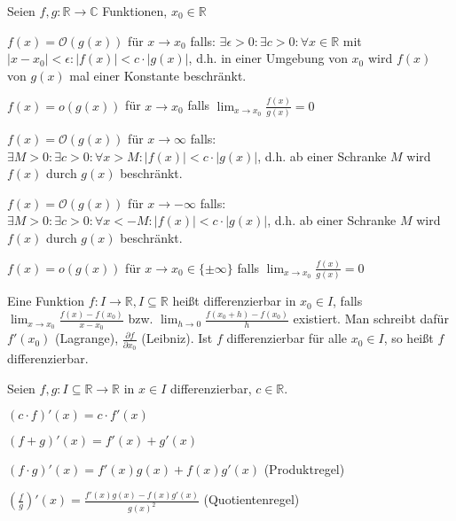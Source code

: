 \documentclass[]{article}
\begin{document}
\begin{definition}
	Seien $f,g : \mathbb{R} \rightarrow \mathbb{C}$ Funktionen, $x_0 \in \mathbb{R}$
	\begin{description}[noitemsep]
		\item $f(x) = \mathcal{O}(g(x))$ für $x \rightarrow x_0$ falls: $\exists \epsilon > 0: \exists c > 0 : \forall x \in \mathbb{R}$ mit $|x - x _0| < \epsilon : |f(x)| < c \cdot |g(x)|$, d.h. in einer Umgebung von $x_0$ wird $f(x)$ von $g(x)$ mal einer Konstante beschränkt.
		\item $f(x) = o(g(x))$ für $x \rightarrow x_0$ falls $\lim_{x \rightarrow x_0} \frac{f(x)}{g(x)} = 0 $
		\item $f(x) = \mathcal{O}(g(x))$ für $x \rightarrow \infty$ falls: $\exists M > 0: \exists c > 0 : \forall x > M : |f(x)| < c \cdot |g(x)|$, d.h. ab einer Schranke $M$ wird $f(x)$ durch $g(x)$ beschränkt.
		\item $f(x) = \mathcal{O}(g(x))$ für $x \rightarrow -\infty$ falls: $\exists M > 0: \exists c > 0 : \forall x < -M : |f(x)| < c \cdot |g(x)|$, d.h. ab einer Schranke $M$ wird $f(x)$ durch $g(x)$ beschränkt.	
		\item $f(x) = o(g(x))$ für $x \rightarrow x_0 \in \{\pm \infty\}$ falls $\lim_{x \rightarrow x_0} \frac{f(x)}{g(x)} = 0 $
	\end{description}
\end{definition}

\begin{definition}[Differenzierbarkeit]
	Eine Funktion $f : I \rightarrow \mathbb{R}, I \subseteq \mathbb{R}$ heißt differenzierbar in $x_0 \in I$, falls $\lim_{x \rightarrow x_0} \frac{f(x) - f(x_0)}{x - x_0}$ bzw. $\lim_{h \rightarrow 0} \frac{f(x_0 + h) - f(x_0)}{h}$ existiert. Man schreibt dafür $f'(x_0)$ (Lagrange), $\frac{\partial f}{\partial x_0}$ (Leibniz). Ist $f$ differenzierbar für alle $x_0 \in I$, so heißt $f$ differenzierbar.
\end{definition}

\begin{satz}
	Seien $f,g : I \subseteq \mathbb{R} \rightarrow \mathbb{R}$ in $x \in I$ differenzierbar, $c \in \mathbb{R}$.
	\begin{description}[noitemsep]
		\item $(c \cdot f)'(x) = c \cdot f'(x) $
		\item $(f + g)'(x) = f'(x) + g'(x) $
		\item $(f \cdot g)'(x) = f'(x) g(x) + f(x)g'(x) $  (Produktregel)
		\item $(\frac{f}{g})'(x) = \frac{f'(x) g(x) - f(x)g'(x)}{g(x)^2} $	 (Quotientenregel)
	\end{description}
\end{satz}
\end{document}
